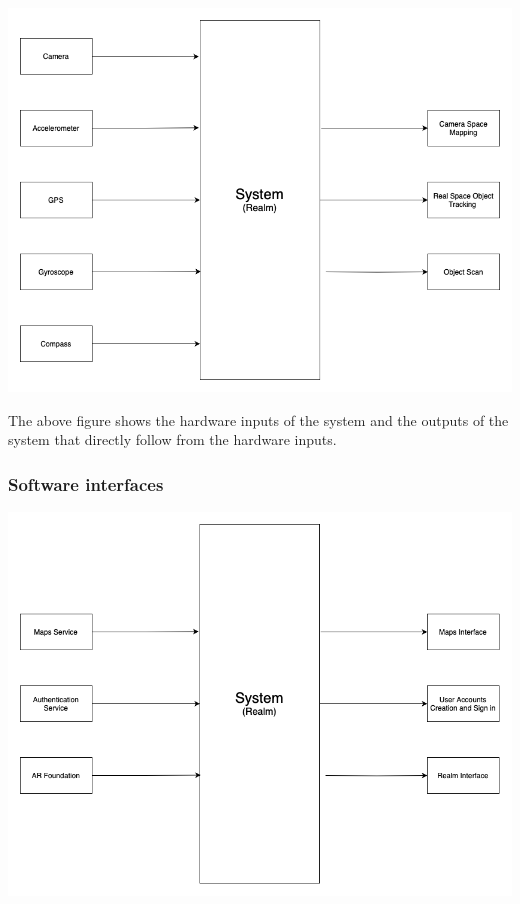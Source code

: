 \documentclass{article}
\begin{document}
\begin{center}
    \includegraphics[scale=0.4]{OtherDiagrams/hscd.png}
\end{center}

The above figure shows the hardware inputs of the system and the outputs of the system that directly follow from the hardware inputs.


\subsubsection{Software interfaces}

\begin{center}
    \includegraphics[scale=0.4]{OtherDiagrams/sscd.png}
\end{center}
\end{document}
